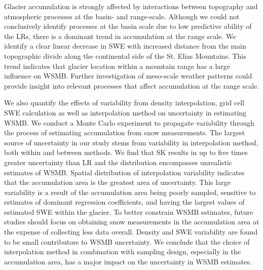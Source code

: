 \documentclass[review,oneside, letterpaper]{igs}
\begin{document}
Glacier accumulation is strongly affected by interactions between topography and atmospheric processes at the basin- and range-scale. Although we could not conclusively identify processes at the basin scale due to low predictive ability of the LRs, there is a dominant trend in accumulation at the range scale. We identify a clear linear decrease in SWE with increased distance from the main topographic divide along the continental side of the St. Elias Mountains. This trend indicates that glacier location within a mountain range has a large influence on WSMB. Further investigation of meso-scale weather patterns could provide insight into relevant processes that affect accumulation at the range scale.

We also quantify the effects of variability from density interpolation, grid cell SWE calculation as well as interpolation method on uncertainty in estimating WSMB. We conduct a Monte Carlo experiment to propagate variability through the process of estimating accumulation from snow measurements. The largest source of uncertainty in our study stems from variability in interpolation method, both within and between methods. We find that SK results in up to five times greater uncertainty than LR and the distribution encompasses unrealistic estimates of WSMB. Spatial distribution of interpolation variability indicates that the accumulation area is the greatest area of uncertainty. This large variability is a result of the accumulation area being poorly sampled, sensitive to estimates of dominant regression coefficients, and having the largest values of estimated SWE within the glacier. To better constrain WSMB estimates, future studies should focus on obtaining snow measurements in the accumulation area at the expense of collecting less data overall. Density and SWE variability are found to be small contributors to WSMB uncertainty. We conclude that the choice of interpolation method in combination with sampling design, especially in the accumulation area, has a major impact on the uncertainty in WSMB estimates.



%
%



\end{document}
